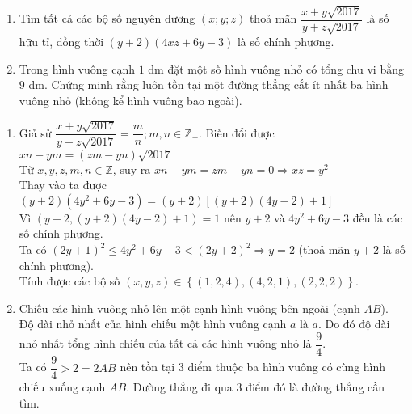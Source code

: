 \begin{ex}%
 \hfill
\begin{enumerate}[1)]
\item Tìm tất cả các bộ số nguyên dương $(x; y; z)$ thoả mãn $\dfrac{x + y\sqrt{2017}}{y + z\sqrt{2017}}$ là số hữu tỉ, đồng thời $(y + 2)(4xz + 6y - 3)$ là số chính phương. 
\item Trong hình vuông cạnh $1$ dm đặt một số hình vuông nhỏ có tổng chu vi bằng $9$ dm. Chứng minh rằng luôn tồn tại một đường thẳng cắt ít nhất ba hình vuông nhỏ (không kể hình vuông bao ngoài). 
\end{enumerate}
\end{ex}
\loigiai
{
\begin{enumerate}[1)]
\item  Giả sử $\dfrac{x + y\sqrt{2017}}{y + z\sqrt{2017}}=\dfrac{m}{n}; m, n\in \mathbb{Z}_+$. Biến đổi được $xn - ym=(zm - yn)\sqrt{2017}$\\
Từ $x, y, z, m, n\in \mathbb{Z}$, suy ra $xn - ym=zm - yn=0\Rightarrow xz=y^2$\\
Thay vào ta được $(y + 2)(4y^2 + 6y - 3)=(y + 2)\left[(y + 2)(4y - 2) + 1\right]$\\
Vì $\left(y + 2, (y + 2)(4y - 2) + 1\right)=1$ nên $y + 2$ và $4y^2 + 6y - 3$ đều là các số chính phương.\\
 Ta có $(2y + 1)^2\le 4y^2 + 6y - 3<(2y + 2)^2\Rightarrow y=2$ (thoả mãn $y + 2$ là số chính phương). \\
Tính được các bộ số $(x, y, z)\in \left\{(1,2, 4), (4,2, 1), (2,2, 2)\right\}$.

\item Chiếu các hình vuông nhỏ lên một cạnh hình vuông bên ngoài (cạnh $AB$).\\
Độ dài nhỏ nhất của hình chiếu một hình vuông cạnh $a$ là $a$. Do đó độ dài nhỏ nhất tổng hình chiếu của tất cả các hình vuông nhỏ là $\dfrac{9}{4}$. 	\\
Ta có $\dfrac{9}{4}>2=2AB$ nên tồn tại 3 điểm thuộc ba hình vuông có cùng hình chiếu xuống cạnh $AB$. Đường thẳng đi qua 3 điểm đó là đường thẳng cần tìm.
\end{enumerate}
}




